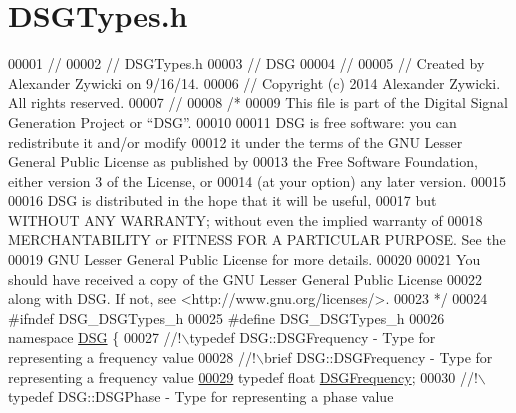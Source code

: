 \hypertarget{_d_s_g_types_8h_source}{\section{D\+S\+G\+Types.\+h}
\label{_d_s_g_types_8h_source}
}

\begin{DoxyCode}
00001 \textcolor{comment}{//}
00002 \textcolor{comment}{//  DSGTypes.h}
00003 \textcolor{comment}{//  DSG}
00004 \textcolor{comment}{//}
00005 \textcolor{comment}{//  Created by Alexander Zywicki on 9/16/14.}
00006 \textcolor{comment}{//  Copyright (c) 2014 Alexander Zywicki. All rights reserved.}
00007 \textcolor{comment}{//}
00008 \textcolor{comment}{/*}
00009 \textcolor{comment}{ This file is part of the Digital Signal Generation Project or “DSG”.}
00010 \textcolor{comment}{}
00011 \textcolor{comment}{ DSG is free software: you can redistribute it and/or modify}
00012 \textcolor{comment}{ it under the terms of the GNU Lesser General Public License as published by}
00013 \textcolor{comment}{ the Free Software Foundation, either version 3 of the License, or}
00014 \textcolor{comment}{ (at your option) any later version.}
00015 \textcolor{comment}{}
00016 \textcolor{comment}{ DSG is distributed in the hope that it will be useful,}
00017 \textcolor{comment}{ but WITHOUT ANY WARRANTY; without even the implied warranty of}
00018 \textcolor{comment}{ MERCHANTABILITY or FITNESS FOR A PARTICULAR PURPOSE.  See the}
00019 \textcolor{comment}{ GNU Lesser General Public License for more details.}
00020 \textcolor{comment}{}
00021 \textcolor{comment}{ You should have received a copy of the GNU Lesser General Public License}
00022 \textcolor{comment}{ along with DSG.  If not, see <http://www.gnu.org/licenses/>.}
00023 \textcolor{comment}{ */}
00024 \textcolor{preprocessor}{#ifndef DSG\_DSGTypes\_h}
00025 \textcolor{preprocessor}{#define DSG\_DSGTypes\_h}
00026 \textcolor{keyword}{namespace }\hyperlink{namespace_d_s_g}{DSG} \{\textcolor{comment}{}
00027 \textcolor{comment}{    //!\(\backslash\)typedef DSG::DSGFrequency - Type for representing a frequency value}
00028 \textcolor{comment}{    //!\(\backslash\)brief DSG::DSGFrequency - Type for representing a frequency value}
\hypertarget{_d_s_g_types_8h_source_l00029}{}\hyperlink{namespace_d_s_g_a4315a061386fa1014fda09b15d3a6973}{00029} \textcolor{comment}{}    \textcolor{keyword}{typedef} \textcolor{keywordtype}{float} \hyperlink{namespace_d_s_g_a4315a061386fa1014fda09b15d3a6973}{DSGFrequency};\textcolor{comment}{}
00030 \textcolor{comment}{    //!\(\backslash\)typedef DSG::DSGPhase - Type for representing a phase value}

\end{DoxyCode}

